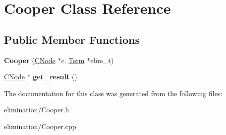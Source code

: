 \hypertarget{classCooper}{\section{\-Cooper \-Class \-Reference}
\label{classCooper}
}
\subsection*{\-Public \-Member \-Functions}
\begin{DoxyCompactItemize}
\item 
\hypertarget{classCooper_a0c45eac5e0c933c60ca5c1a20983d9e1}{{\bfseries \-Cooper} (\hyperlink{classCNode}{\-C\-Node} $\ast$c, \hyperlink{classTerm}{\-Term} $\ast$elim\-\_\-t)}\label{classCooper_a0c45eac5e0c933c60ca5c1a20983d9e1}

\item 
\hypertarget{classCooper_acbfb11eb235246f921776450958bfa92}{\hyperlink{classCNode}{\-C\-Node} $\ast$ {\bfseries get\-\_\-result} ()}\label{classCooper_acbfb11eb235246f921776450958bfa92}

\end{DoxyCompactItemize}


\-The documentation for this class was generated from the following files\-:\begin{DoxyCompactItemize}
\item 
elimination/\-Cooper.\-h\item 
elimination/\-Cooper.\-cpp\end{DoxyCompactItemize}
